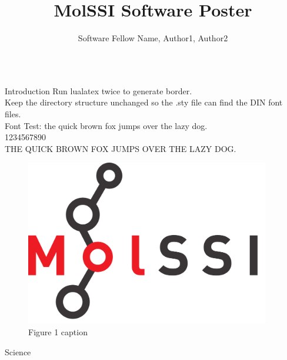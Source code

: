 \documentclass{beamer}
\title{MolSSI Software Poster}
\author{Software Fellow Name, Author1, Author2}
\institute{Author Affiliations}
\begin{document}
  \rmfamily


  \begin{frame}
    \vfill

    \begin{columns}[t]

      \begin{column}{.417\linewidth}

        \begin{section}{Introduction}
          Run lualatex twice to generate border.\\
          Keep the directory structure unchanged so the .sty file can find the DIN font files.\\
          Font Test: the quick brown fox jumps over the lazy dog.\\
          1234567890\\
          THE QUICK BROWN FOX JUMPS OVER THE LAZY DOG.\\
          
          \bigskip
          \bigskip
          \lipsum[1-2]

          \begin{figure}[h]
            \includegraphics[width=0.80\linewidth]{./images/molssi_main_logo.png}
            \caption{Figure 1 caption}
          \end{figure}
        \end{section}

        \begin{section}{Science}
          \lipsum[1]
        \end{section}

      \end{column}

      \begin{column}{.417\linewidth}


\end{column}
\end{columns}
\end{frame}
\end{document}
